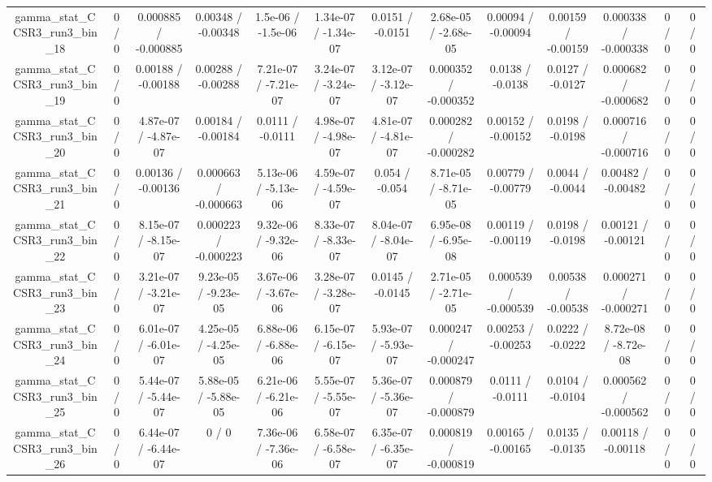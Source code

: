 \documentclass[10pt]{article}
\begin{document}
\begin{table}[htbp]
\begin{center}
\begin{tabular}{|c|c|c|c|c|c|c|c|c|c|c|c|c|}
  gamma_stat_CCSR3_run3_bin_18 & 0 / 0 & 0.000885 / -0.000885 & 0.00348 / -0.00348 & 1.5e-06 / -1.5e-06 & 1.34e-07 / -1.34e-07 & 0.0151 / -0.0151 & 2.68e-05 / -2.68e-05 & 0.00094 / -0.00094 & 0.00159 / -0.00159 & 0.000338 / -0.000338 & 0 / 0 & 0 / 0 \\ 
  gamma_stat_CCSR3_run3_bin_19 & 0 / 0 & 0.00188 / -0.00188 & 0.00288 / -0.00288 & 7.21e-07 / -7.21e-07 & 3.24e-07 / -3.24e-07 & 3.12e-07 / -3.12e-07 & 0.000352 / -0.000352 & 0.0138 / -0.0138 & 0.0127 / -0.0127 & 0.000682 / -0.000682 & 0 / 0 & 0 / 0 \\ 
  gamma_stat_CCSR3_run3_bin_20 & 0 / 0 & 4.87e-07 / -4.87e-07 & 0.00184 / -0.00184 & 0.0111 / -0.0111 & 4.98e-07 / -4.98e-07 & 4.81e-07 / -4.81e-07 & 0.000282 / -0.000282 & 0.00152 / -0.00152 & 0.0198 / -0.0198 & 0.000716 / -0.000716 & 0 / 0 & 0 / 0 \\ 
  gamma_stat_CCSR3_run3_bin_21 & 0 / 0 & 0.00136 / -0.00136 & 0.000663 / -0.000663 & 5.13e-06 / -5.13e-06 & 4.59e-07 / -4.59e-07 & 0.054 / -0.054 & 8.71e-05 / -8.71e-05 & 0.00779 / -0.00779 & 0.0044 / -0.0044 & 0.00482 / -0.00482 & 0 / 0 & 0 / 0 \\ 
  gamma_stat_CCSR3_run3_bin_22 & 0 / 0 & 8.15e-07 / -8.15e-07 & 0.000223 / -0.000223 & 9.32e-06 / -9.32e-06 & 8.33e-07 / -8.33e-07 & 8.04e-07 / -8.04e-07 & 6.95e-08 / -6.95e-08 & 0.00119 / -0.00119 & 0.0198 / -0.0198 & 0.00121 / -0.00121 & 0 / 0 & 0 / 0 \\ 
  gamma_stat_CCSR3_run3_bin_23 & 0 / 0 & 3.21e-07 / -3.21e-07 & 9.23e-05 / -9.23e-05 & 3.67e-06 / -3.67e-06 & 3.28e-07 / -3.28e-07 & 0.0145 / -0.0145 & 2.71e-05 / -2.71e-05 & 0.000539 / -0.000539 & 0.00538 / -0.00538 & 0.000271 / -0.000271 & 0 / 0 & 0 / 0 \\ 
  gamma_stat_CCSR3_run3_bin_24 & 0 / 0 & 6.01e-07 / -6.01e-07 & 4.25e-05 / -4.25e-05 & 6.88e-06 / -6.88e-06 & 6.15e-07 / -6.15e-07 & 5.93e-07 / -5.93e-07 & 0.000247 / -0.000247 & 0.00253 / -0.00253 & 0.0222 / -0.0222 & 8.72e-08 / -8.72e-08 & 0 / 0 & 0 / 0 \\ 
  gamma_stat_CCSR3_run3_bin_25 & 0 / 0 & 5.44e-07 / -5.44e-07 & 5.88e-05 / -5.88e-05 & 6.21e-06 / -6.21e-06 & 5.55e-07 / -5.55e-07 & 5.36e-07 / -5.36e-07 & 0.000879 / -0.000879 & 0.0111 / -0.0111 & 0.0104 / -0.0104 & 0.000562 / -0.000562 & 0 / 0 & 0 / 0 \\ 
  gamma_stat_CCSR3_run3_bin_26 & 0 / 0 & 6.44e-07 / -6.44e-07 & 0 / 0 & 7.36e-06 / -7.36e-06 & 6.58e-07 / -6.58e-07 & 6.35e-07 / -6.35e-07 & 0.000819 / -0.000819 & 0.00165 / -0.00165 & 0.0135 / -0.0135 & 0.00118 / -0.00118 & 0 / 0 & 0 / 0 \\ 

\end{tabular}
\end{center}
\end{table}
\end{document}
